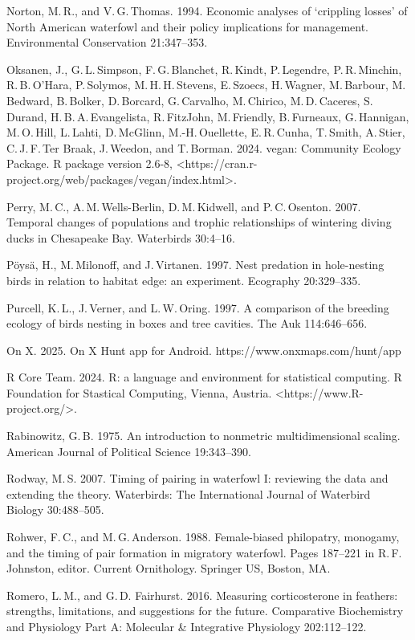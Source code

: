 \begin{hangparas}{2em}{1}
	Norton, M.\,R., and V.\,G.\,Thomas. 1994. Economic analyses of ‘crippling losses’ of North American waterfowl and their policy implications for management. Environmental Conservation 21:347–353. 
	
	Oksanen, J., G.\,L.\,Simpson, F.\,G.\,Blanchet, R.\,Kindt, P.\,Legendre, P.\,R.\,Minchin, R.\,B.\,O’Hara, P.\,Solymos, M.\,H.\,H.\,Stevens, E.\,Szoecs, H.\,Wagner, M.\,Barbour, M.\,Bedward, B.\,Bolker, D.\,Borcard, G.\,Carvalho, M.\,Chirico, M.\,D.\,Caceres, S.\,Durand, H.\,B.\,A.\,Evangelista, R.\,FitzJohn, M.\,Friendly, B.\,Furneaux, G.\,Hannigan, M.\,O.\,Hill, L.\,Lahti, D.\,McGlinn, M.-H.\,Ouellette, E.\,R.\,Cunha, T.\,Smith, A.\,Stier, C.\,J.\,F.\,Ter Braak, J.\,Weedon, and T.\,Borman. 2024. vegan: Community Ecology Package. R package version 2.6-8, <https://cran.r-project.org/web/packages/vegan/index.html>. 
	
	Perry, M.\,C., A.\,M.\,Wells-Berlin, D.\,M.\,Kidwell, and P.\,C.\,Osenton. 2007. Temporal changes of populations and trophic relationships of wintering diving ducks in Chesapeake Bay. Waterbirds 30:4–16. 
	
	Pöysä, H., M.\,Milonoff, and J.\,Virtanen. 1997. Nest predation in hole-nesting birds in relation to habitat edge: an experiment. Ecography 20:329–335. 
	
	Purcell, K.\,L., J.\,Verner, and L.\,W.\,Oring. 1997. A comparison of the breeding ecology of birds nesting in boxes and tree cavities. The Auk 114:646–656. 
	
	On X. 2025. On X Hunt app for Android. https://www.onxmaps.com/hunt/app
	
	R Core Team. 2024. R: a language and environment for statistical computing. R Foundation for Stastical Computing, Vienna, Austria.  <https://www.R-project.org/>.
	
	Rabinowitz, G.\,B. 1975. An introduction to nonmetric multidimensional scaling. American Journal of Political Science 19:343–390. 
	
	Rodway, M.\,S. 2007. Timing of pairing in waterfowl I: reviewing the data and extending the theory. Waterbirds: The International Journal of Waterbird Biology 30:488–505. 
	
	Rohwer, F.\,C., and M.\,G.\,Anderson. 1988. Female-biased philopatry, monogamy, and the timing of pair formation in migratory waterfowl. Pages 187–221 in R.\,F.\,Johnston, editor. Current Ornithology. Springer US, Boston, MA. 
	
	Romero, L.\,M., and G.\,D. Fairhurst. 2016. Measuring corticosterone in feathers: strengths, limitations, and suggestions for the future. Comparative Biochemistry and Physiology Part A: Molecular \& Integrative Physiology 202:112–122. 
	

\end{hangparas}
